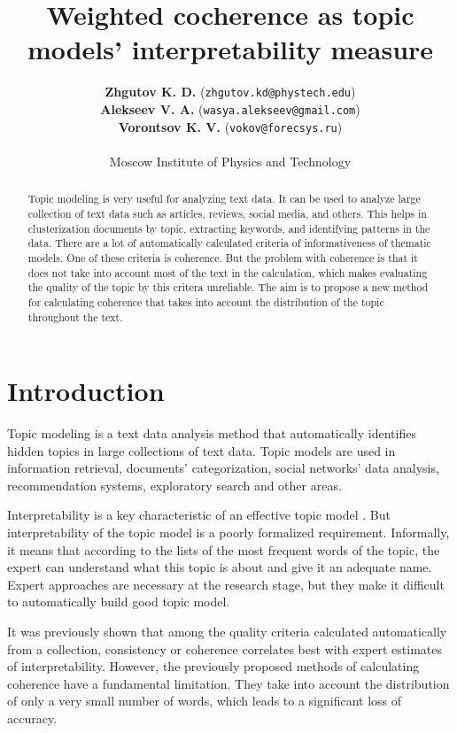 \documentclass{article}
\title{Weighted cocherence as topic models' interpretability measure}
\author{ 
\textbf{Zhgutov K. D.} (\texttt{zhgutov.kd@phystech.edu}) \\
\textbf{Alekseev V. A.} (\texttt{wasya.alekseev@gmail.com}) \\
\textbf{Vorontsov K. V.} (\texttt{vokov@forecsys.ru}) \\
\\
Moscow Institute of Physics and Technology
}
\date{}
\begin{document}
\maketitle

\begin{abstract}
Topic modeling is very useful for analyzing text data. It can be used to analyze large collection of text data such as articles, reviews, social media, and others. This helps in clusterization documents by topic, extracting keywords, and identifying patterns in the data. There are a lot of automatically calculated criteria of informativeness of thematic models. One of these criteria is coherence. But the problem with coherence is that it does not take into account most of the text in the calculation, which makes evaluating the quality of the topic by this critera unreliable. The aim is to propose a new method for calculating coherence that takes into account the distribution of the topic throughout the text.
\end{abstract}



\section{Introduction}
Topic modeling is a text data analysis method that automatically identifies hidden topics in large collections of text data. Topic models are used in information retrieval, documents’ categorization, social networks’ data analysis, recommendation systems, exploratory search and other areas.

Interpretability is a key characteristic of an effective topic model \cite{ReadingTeaLeaves}. But interpretability of the topic model is a poorly formalized requirement. Informally, it means that according to the lists of the most frequent words of the topic, the expert can understand what this topic is about and give it an adequate name. Expert approaches are necessary at the research stage, but they make it difficult to automatically build good topic model.

It was previously shown \cite{NewmanCoherency} that among the quality criteria calculated automatically from a collection, consistency or coherence correlates best with expert estimates of interpretability. However, the previously proposed methods of calculating coherence have a fundamental limitation. They take into account the distribution of only a very small number of words, which leads to a significant loss of accuracy.
\end{document}
